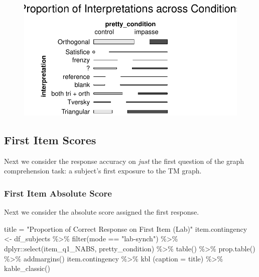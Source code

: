 \documentclass[
  letterpaper,
  DIV=11,
  numbers=noendperiod]{scrreprt}
\newenvironment{Shaded}{\begin{snugshade}}{\end{snugshade}}
\newcommand{\AttributeTok}[1]{\textcolor[rgb]{0.40,0.45,0.13}{#1}}
\newcommand{\FunctionTok}[1]{\textcolor[rgb]{0.28,0.35,0.67}{#1}}
\newcommand{\NormalTok}[1]{\textcolor[rgb]{0.00,0.23,0.31}{#1}}
\newcommand{\OtherTok}[1]{\textcolor[rgb]{0.00,0.23,0.31}{#1}}
\newcommand{\SpecialCharTok}[1]{\textcolor[rgb]{0.37,0.37,0.37}{#1}}
\newcommand{\StringTok}[1]{\textcolor[rgb]{0.13,0.47,0.30}{#1}}
\begin{document}
\begin{figure}[H]

{\centering \includegraphics{analysis/SGC3A/3_sgc3A_description_files/figure-pdf/VIS-ITEM-INTERPRETATION-2.pdf}

}

\end{figure}

\hypertarget{first-item-scores}{%
\subsection{First Item Scores}\label{first-item-scores}}

Next we consider the response accuracy on \emph{just} the first question
of the graph comprehension task: a subject's first exposure to the TM
graph.

\hypertarget{first-item-absolute-score}{%
\subsubsection{First Item Absolute
Score}\label{first-item-absolute-score}}

Next we consider the absolute score assigned the first response.

\begin{Shaded}
\begin{Highlighting}[]
\NormalTok{title }\OtherTok{=} \StringTok{"Proportion of Correct Response on First Item (Lab)"}
\NormalTok{item.contingency }\OtherTok{\textless{}{-}}\NormalTok{ df\_subjects }\SpecialCharTok{\%\textgreater{}\%} \FunctionTok{filter}\NormalTok{(mode }\SpecialCharTok{==} \StringTok{"lab{-}synch"}\NormalTok{) }\SpecialCharTok{\%\textgreater{}\%}\NormalTok{ dplyr}\SpecialCharTok{::}\FunctionTok{select}\NormalTok{(item\_q1\_NABS, pretty\_condition) }\SpecialCharTok{\%\textgreater{}\%} \FunctionTok{table}\NormalTok{() }\SpecialCharTok{\%\textgreater{}\%} \FunctionTok{prop.table}\NormalTok{() }\SpecialCharTok{\%\textgreater{}\%} \FunctionTok{addmargins}\NormalTok{()}
\NormalTok{item.contingency }\SpecialCharTok{\%\textgreater{}\%} \FunctionTok{kbl}\NormalTok{ (}\AttributeTok{caption =}\NormalTok{ title) }\SpecialCharTok{\%\textgreater{}\%} \FunctionTok{kable\_classic}\NormalTok{()}
\end{Highlighting}
\end{Shaded}
\end{document}
